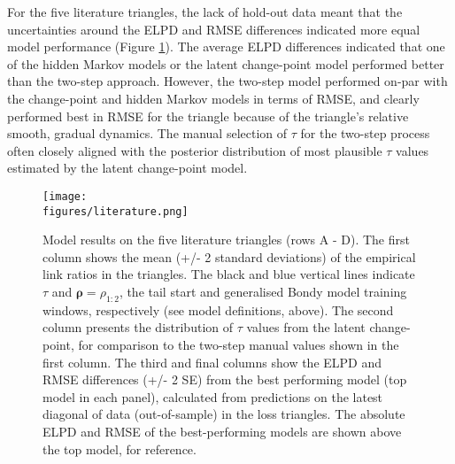 For the five literature triangles, the lack
of hold-out data meant that the uncertainties
around the ELPD and RMSE differences
indicated more equal model performance
(Figure \ref{fig:literature}).
The average ELPD
differences indicated that one of the hidden
Markov models or the latent change-point
model performed better than the
two-step approach.
However, the two-step model
performed on-par with the change-point
and hidden Markov models in terms of RMSE,
and clearly performed best in RMSE
for the \cite{verrall2015} triangle
because of the triangle's relative smooth, 
gradual dynamics.
The manual selection of $\tau$
for the two-step process often
closely aligned with the 
posterior distribution of most
plausible $\tau$ values estimated by the latent
change-point model.

\begin{figure}
    \centering
    \hspace{-1em}
    \texttt{[image: \\figures/literature.png]}
    \caption{
        Model results on the five literature triangles
        (rows A - D). The first
        column shows the mean (+/- 2 standard deviations)
        of the empirical link ratios in the triangles.
        The black and blue vertical lines indicate $\tau$
        and $\bm{\rho} = \rho_{1:2}$, the tail start
        and generalised Bondy model training windows,
        respectively (see model definitions, above).
        The second column presents the distribution
        of $\tau$ values from the latent change-point,
        for comparison to the two-step manual values
        shown in the first column.
        The third and final columns show the
        ELPD and RMSE differences (+/- 2 SE) from the best
        performing model (top model in each panel), calculated
        from predictions on the latest diagonal of
        data (out-of-sample) in the loss triangles.
        The absolute ELPD and RMSE of the best-performing
        models are shown above the top model, for reference.
    }
	\label{fig:literature}
\end{figure}


